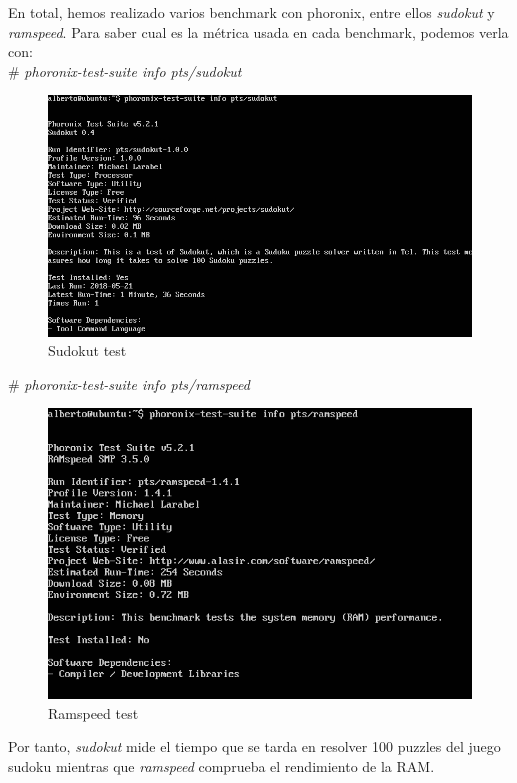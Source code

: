 En total, hemos realizado varios benchmark con phoronix, entre ellos \textit{sudokut} y \textit{ramspeed}. Para saber cual es la métrica usada en cada benchmark, podemos verla con: \\
\# \textit{phoronix-test-suite info pts/sudokut} 

\begin{figure}[h]
	\centering
	\includegraphics[scale=0.4]{images/sudok.png}
	\caption{Sudokut test}
\end{figure}

\# \textit{phoronix-test-suite info pts/ramspeed} 


\begin{figure}[h]
	\centering
	\includegraphics[scale=0.41]{images/rams.png}
	\caption{Ramspeed test}
	
\end{figure}

Por tanto, \textit{sudokut} mide el tiempo que se tarda en resolver 100 puzzles del juego sudoku mientras que \textit{ramspeed} comprueba el rendimiento de la RAM.


